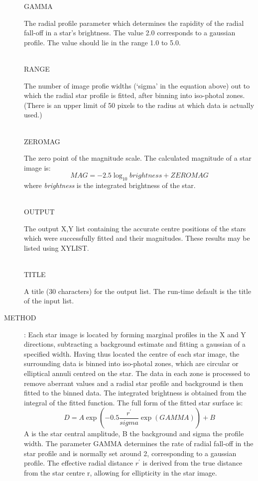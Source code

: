 \begin{description}
\begin{tabbing}
GAMMA\>\begin{minipage}[t]{100mm}
The radial profile parameter which determines the rapidity of the radial
fall-off in a star's brightness.
The value 2.0 corresponds to a gaussian profile.
The value should lie in the range 1.0 to 5.0.
\end{minipage}\\
RANGE\>\begin{minipage}[t]{100mm}
The number of image profie widths (`sigma' in the equation above) out to which
the radial star profile is fitted, after binning into iso-photal zones.
(There is an upper limit of 50 pixels to the radius at which data is actually
used.)
\end{minipage}\\
ZEROMAG\>\begin{minipage}[t]{100mm}
The zero point of the magnitude scale.
The calculated magnitude of a star image is:
\[MAG = -2.5 \log _{10} brightness + ZEROMAG\]
where {\em brightness} is the integrated brightness of the star.
\end{minipage}\\
OUTPUT\>\>\begin{minipage}[t]{100mm}
The output X,Y list containing the accurate centre positions of the stars which
were successfully fitted and their magnitudes.
These results may be listed using XYLIST.
\end{minipage}\\
TITLE\>\>\begin{minipage}[t]{100mm}
A title (30 characters) for the output list.
The run-time default is the title of the input list.
\end{minipage}
\end{tabbing}
\item [METHOD] :
Each star image is located by forming marginal profiles in the X and Y
directions, subtracting a background estimate and fitting a gaussian of a
specified width.
Having thus located the centre of each star image, the surrounding data is
binned into iso-photal zones, which are circular or elliptical annuli centred
on the star.
The data in each zone is processed to remove aberrant values and a radial star
profile and background is then fitted to the binned data.
The integrated brightness is obtained from the integral of the fitted function.
The full form of the fitted star surface is:
\[D = A \exp (-0.5 \frac{r^{\prime}}{sigma} \exp(GAMMA)) + B\]
A is the star central amplitude, B the background and sigma the profile width.
The parameter GAMMA determines the rate of radial fall-off in the star profile
and is normally set around 2, corresponding to a gaussian profile.
The effective radial distance $r^{\prime}$ is derived from the true distance
from the star centre r, allowing for ellipticity in the star image.


\end{description}
